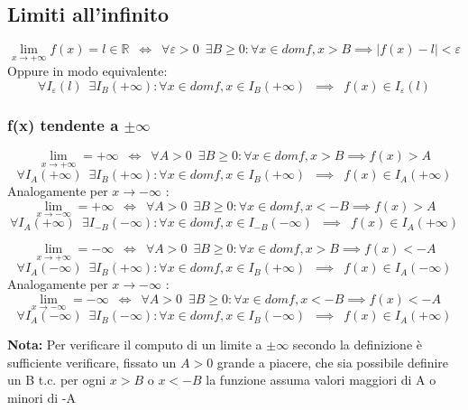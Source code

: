\documentclass[10pt]{article}
\theoremstyle{plain}
\begin{document}
\subsection{Limiti all'infinito}
\begin{defin}
\[\lim \limits_{x \rightarrow +\infty} f(x) = l \in \mathbb{R} \enspace \Longleftrightarrow \enspace \forall \varepsilon > 0 \enspace \exists B \geq 0 : \forall x \in dom f, x > B \implies |f(x) - l| < \varepsilon\]
Oppure in modo equivalente:
\[\forall I_\varepsilon(l) \enspace \exists I_B(+\infty) : \forall x \in dom f, x \in I_B(+\infty) \enspace \implies \enspace f(x) \in I_\varepsilon(l)\]
\end{defin}
\subsubsection{f(x) tendente a $\pm \infty$}
\begin{defin}
\[\lim \limits_{x \rightarrow +\infty} = +\infty \enspace \Longleftrightarrow \enspace \forall A > 0 \enspace \exists B \geq 0 : \forall x \in domf, x > B \implies f(x) > A\]
\[\forall I_A(+\infty) \enspace \exists I_B(+\infty) : \forall x \in dom f, x \in I_B(+\infty) \enspace \implies \enspace f(x) \in I_A(+\infty)\]
Analogamente per $x \rightarrow -\infty$ :
\[\lim \limits_{x \rightarrow -\infty} = +\infty \enspace \Longleftrightarrow \enspace \forall A > 0 \enspace \exists B \geq 0 : \forall x \in domf, x < -B \implies f(x) > A\]
\[\forall I_A(+\infty) \enspace \exists I_{-B}(-\infty) : \forall x \in dom f, x \in I_{-B}(-\infty) \enspace \implies \enspace f(x) \in I_A(+\infty)\]
\end{defin}
\begin{defin}
\[\lim \limits_{x \rightarrow +\infty} = -\infty \enspace \Longleftrightarrow \enspace \forall A > 0 \enspace \exists B \geq 0 : \forall x \in domf, x > B \implies f(x) < -A\]
\[\forall I_A(-\infty) \enspace \exists I_B(+\infty) : \forall x \in dom f, x \in I_B(+\infty) \enspace \implies \enspace f(x) \in I_{A}(-\infty)\]
Analogamente per $x \rightarrow -\infty$ :
\[\lim \limits_{x \rightarrow -\infty} = -\infty \enspace \Longleftrightarrow \enspace \forall A > 0 \enspace \exists B \geq 0 : \forall x \in domf, x < -B \implies f(x) < -A\]
\[\forall I_{A}(-\infty) \enspace \exists I_{B}(-\infty) : \forall x \in dom f, x \in I_{B}(-\infty) \enspace \implies \enspace f(x) \in I_{A}(+\infty)\]
\end{defin}
\textbf{Nota: } Per verificare il computo di un limite a $\pm \infty$ secondo la definizione è sufficiente verificare, fissato un $A > 0$ grande a piacere, che sia possibile definire un B t.c. per ogni $x > B$ o $x < -B$ la funzione assuma valori maggiori di A o minori di -A
\end{document}
